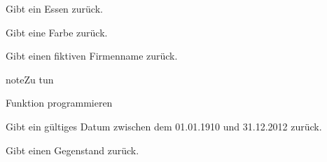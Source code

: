 \documentclass[a4paper,12pt,oneside]{sphinxmanual}
\begin{document}

\begin{fulllineitems}
\label{module:pyzufall.generator.essen}
Gibt ein Essen zurück.

\end{fulllineitems}


\begin{fulllineitems}
\label{module:pyzufall.generator.farbe}
Gibt eine Farbe zurück.

\end{fulllineitems}


\begin{fulllineitems}
\label{module:pyzufall.generator.firma}
Gibt einen fiktiven Firmenname zurück.

\begin{notice}{note}{Zu tun}

Funktion programmieren
\end{notice}

\end{fulllineitems}


\begin{fulllineitems}
\label{module:pyzufall.generator.geburtsdatum}
Gibt ein gültiges Datum zwischen dem 01.01.1910 und 31.12.2012 zurück.

\end{fulllineitems}


\begin{fulllineitems}
\label{module:pyzufall.generator.gegenstand}
Gibt einen Gegenstand zurück.

\end{fulllineitems}

\end{document}
